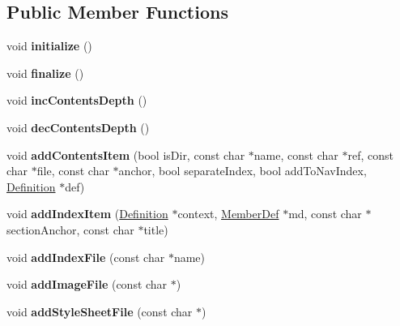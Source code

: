 \subsection*{Public Member Functions}
\begin{DoxyCompactItemize}
\item 
\mbox{\label{class_doc_sets_a7cad610aa745779c12a50c3dcf2cdf61}} 
void {\bfseries initialize} ()
\item 
\mbox{\label{class_doc_sets_a8c00f9b45e88f7907db6a0e7488a7a0b}} 
void {\bfseries finalize} ()
\item 
\mbox{\label{class_doc_sets_a5840cce402cd857d80a49275c70d0000}} 
void {\bfseries inc\+Contents\+Depth} ()
\item 
\mbox{\label{class_doc_sets_a27dd321d6203de4d44b1b3b2fbc0a3a5}} 
void {\bfseries dec\+Contents\+Depth} ()
\item 
\mbox{\label{class_doc_sets_a5d641c4cf123b6a4e5ba33e9d6f36144}} 
void {\bfseries add\+Contents\+Item} (bool is\+Dir, const char $\ast$name, const char $\ast$ref, const char $\ast$file, const char $\ast$anchor, bool separate\+Index, bool add\+To\+Nav\+Index, \mbox{\hyperlink{class_definition}{Definition}} $\ast$def)
\item 
\mbox{\label{class_doc_sets_a5d979532e4ed0249c960401d1a163f8a}} 
void {\bfseries add\+Index\+Item} (\mbox{\hyperlink{class_definition}{Definition}} $\ast$context, \mbox{\hyperlink{class_member_def}{Member\+Def}} $\ast$md, const char $\ast$section\+Anchor, const char $\ast$title)
\item 
\mbox{\label{class_doc_sets_ae9fc1949f8b1101a7f854292f7d0a4a2}} 
void {\bfseries add\+Index\+File} (const char $\ast$name)
\item 
\mbox{\label{class_doc_sets_ae7cab9023e6c8e4d2d16144d3c5907c6}} 
void {\bfseries add\+Image\+File} (const char $\ast$)
\item 
\mbox{\label{class_doc_sets_a6c482a3663c7ed24debd7507f8977c7a}} 
void {\bfseries add\+Style\+Sheet\+File} (const char $\ast$)
\end{DoxyCompactItemize}


